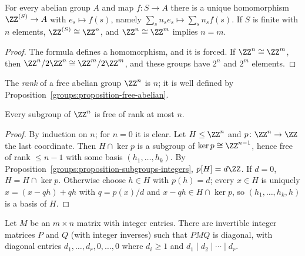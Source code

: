 \begin{proposition}\label{groups:proposition-free-abelian}
For every abelian group $A$ and map $f \colon S \to A$ there is a unique homomorphism
$\ZZ^{(S)} \to A$ with $e_s \mapsto f(s)$, namely $\sum_s n_s e_s \mapsto \sum_s n_s f(s)$. If
$S$ is finite with $n$ elements, $\ZZ^{(S)} \cong \ZZ^n$, and $\ZZ^n \cong \ZZ^m$ implies $n = m$.
\end{proposition}

\begin{proof}
The formula defines a homomorphism, and it is forced. If $\ZZ^n \cong \ZZ^m$, then
$\ZZ^n/2\ZZ^n \cong \ZZ^m/2\ZZ^m$, and these groups have $2^n$ and $2^m$ elements.
\end{proof}

\begin{definition}\label{groups:definition-rank}
The \emph{rank} of a free abelian group $\ZZ^n$ is $n$; it is well defined by
Proposition~\ref{groups:proposition-free-abelian}.
\end{definition}

\begin{proposition}\label{groups:proposition-subgroups-free}
Every subgroup of $\ZZ^n$ is free of rank at most $n$.
\end{proposition}

\begin{proof}
By induction on $n$; for $n = 0$ it is clear. Let $H \leq \ZZ^n$ and
$p \colon \ZZ^n \to \ZZ$ the last coordinate. Then $H \cap \ker p$ is a subgroup of
$\ker p \cong \ZZ^{n-1}$, hence free of rank $\leq n - 1$ with some basis $(h_1, \ldots, h_k)$.
By Proposition~\ref{groups:proposition-subgroups-integers}, $p[H] = d\ZZ$. If $d = 0$,
$H = H \cap \ker p$. Otherwise choose $h \in H$ with $p(h) = d$; every $x \in H$ is uniquely
$x = (x - q h) + qh$ with $q = p(x)/d$ and $x - qh \in H \cap \ker p$, so $(h_1, \ldots, h_k, h)$
is a basis of $H$.
\end{proof}

\begin{theorem}\label{groups:theorem-smith}
Let $M$ be an $m \times n$ matrix with integer entries. There are invertible integer
matrices $P$ and $Q$ (with integer inverses) such that $PMQ$ is diagonal, with
diagonal entries $d_1, \ldots, d_r, 0, \ldots, 0$ where $d_i \geq 1$ and
$d_1 \mid d_2 \mid \cdots \mid d_r$.
\end{theorem}

